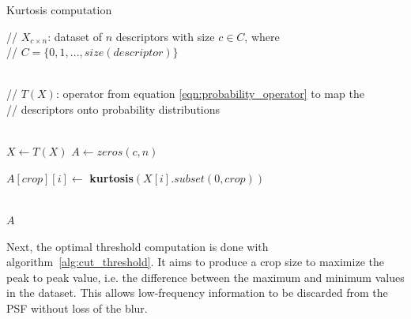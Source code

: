 \begin{algorithm}[htb]
	\caption{Kurtosis computation}
	\label{alg:kurtosis_array}
	\begin{algorithmic}[1]
	    \State // $X_{c \times n}$: dataset of $n$ descriptors with size $c \in C$, where \\ // $C = \{0,1,...,size(descriptor)\}$ 
	    
	    \\
	    
	    \State // $T(X)$: operator from equation \ref{eqn:probability_operator} to map the \\ // descriptors onto probability distributions
	   
        \\
        
		\State $X \gets T(X)$
		\State $A \gets zeros(c, n)$
		
		
        		\State $A[crop][i] \gets$ \textbf{kurtosis}$\left(X[i].subset(0, crop)\right)$
		
		    \EndFor
		\EndFor
		
		\\
		
		\Return $A$
	\end{algorithmic}
\end{algorithm}

\noindent Next, the optimal threshold computation is done with algorithm~\ref{alg:cut_threshold}. It aims to produce a crop size to maximize the peak to peak value, i.e. the difference between the maximum and minimum values in the dataset. This allows low-frequency information to be discarded from the PSF without loss of the blur.

